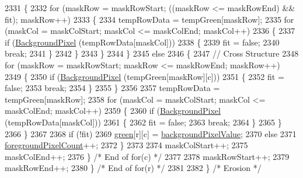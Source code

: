 \begin{DoxyCode}
2331         \{
2332           \textcolor{keywordflow}{for}  (maskRow = maskRowStart;  ((maskRow <= maskRowEnd)  &&  fit);  maskRow++)
2333           \{
2334             tempRowData =  tempGreen[maskRow];
2335             \textcolor{keywordflow}{for}  (maskCol = maskColStart;  maskCol <= maskColEnd;  maskCol++)
2336             \{
2337               \textcolor{keywordflow}{if}  (\hyperlink{class_k_k_b_1_1_raster_a0756fb5530274d5e28858d3e1633d595}{BackgroundPixel} (tempRowData[maskCol]))
2338               \{
2339                 fit = \textcolor{keyword}{false};
2340                 \textcolor{keywordflow}{break};
2341               \}
2342             \}
2343           \}
2344         \}
2345         \textcolor{keywordflow}{else}
2346         \{
2347           \textcolor{comment}{//  Cross Structure}
2348           \textcolor{keywordflow}{for}  (maskRow = maskRowStart;  maskRow <= maskRowEnd;  maskRow++)
2349           \{
2350             \textcolor{keywordflow}{if}  (\hyperlink{class_k_k_b_1_1_raster_a0756fb5530274d5e28858d3e1633d595}{BackgroundPixel} (tempGreen[maskRow][c]))
2351             \{
2352               fit = \textcolor{keyword}{false};
2353               \textcolor{keywordflow}{break};
2354             \}
2355           \}
2356 
2357           tempRowData =  tempGreen[maskRow];
2358           \textcolor{keywordflow}{for}  (maskCol = maskColStart;  maskCol <= maskColEnd;  maskCol++)
2359           \{
2360             \textcolor{keywordflow}{if}  (\hyperlink{class_k_k_b_1_1_raster_a0756fb5530274d5e28858d3e1633d595}{BackgroundPixel} (tempRowData[maskCol]))
2361             \{
2362               fit = \textcolor{keyword}{false};
2363               \textcolor{keywordflow}{break};
2364             \}
2365           \}
2366         \}
2367 
2368         \textcolor{keywordflow}{if}  (!fit)
2369           \hyperlink{class_k_k_b_1_1_raster_a2d2238911145488e226cd2e34fc8448c}{green}[r][c] = \hyperlink{class_k_k_b_1_1_raster_ab7ed2191cce116a6a37029dc6e3713ef}{backgroundPixelValue};
2370         \textcolor{keywordflow}{else}
2371           \hyperlink{class_k_k_b_1_1_raster_aa7e86253f4b9c347da718732e44b60e8}{foregroundPixelCount}++;
2372       \}
2373 
2374       maskColStart++;
2375       maskColEnd++;
2376     \}   \textcolor{comment}{/* End of for(c) */}
2377 
2378     maskRowStart++;
2379     maskRowEnd++;
2380   \}   \textcolor{comment}{/* End of for(r) */}
2381 
2382 \}  \textcolor{comment}{/* Erosion */}
\end{DoxyCode}
